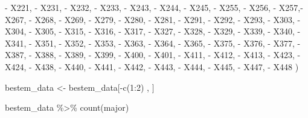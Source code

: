 \documentclass[
]{article}
\newenvironment{Shaded}{\begin{snugshade}}{\end{snugshade}}
\newcommand{\DecValTok}[1]{\textcolor[rgb]{0.00,0.00,0.81}{#1}}
\newcommand{\FunctionTok}[1]{\textcolor[rgb]{0.00,0.00,0.00}{#1}}
\newcommand{\NormalTok}[1]{#1}
\newcommand{\OtherTok}[1]{\textcolor[rgb]{0.56,0.35,0.01}{#1}}
\newcommand{\SpecialCharTok}[1]{\textcolor[rgb]{0.00,0.00,0.00}{#1}}
\begin{document}
\begin{Shaded}
\begin{Highlighting}[]
         \SpecialCharTok{{-}}\NormalTok{ X221, }\SpecialCharTok{{-}}\NormalTok{ X231, }\SpecialCharTok{{-}}\NormalTok{ X232, }\SpecialCharTok{{-}}\NormalTok{ X233, }\SpecialCharTok{{-}}\NormalTok{ X243, }\SpecialCharTok{{-}}\NormalTok{ X244, }\SpecialCharTok{{-}}\NormalTok{ X245, }\SpecialCharTok{{-}}\NormalTok{ X255, }\SpecialCharTok{{-}}\NormalTok{ X256, }\SpecialCharTok{{-}}\NormalTok{ X257,}\SpecialCharTok{{-}}\NormalTok{ X267,}
         \SpecialCharTok{{-}}\NormalTok{ X268, }\SpecialCharTok{{-}}\NormalTok{ X269, }\SpecialCharTok{{-}}\NormalTok{ X279, }\SpecialCharTok{{-}}\NormalTok{ X280, }\SpecialCharTok{{-}}\NormalTok{ X281, }\SpecialCharTok{{-}}\NormalTok{ X291, }\SpecialCharTok{{-}}\NormalTok{ X292, }\SpecialCharTok{{-}}\NormalTok{ X293, }\SpecialCharTok{{-}}\NormalTok{ X303, }\SpecialCharTok{{-}}\NormalTok{X304, }\SpecialCharTok{{-}}\NormalTok{ X305,}
         \SpecialCharTok{{-}}\NormalTok{ X315, }\SpecialCharTok{{-}}\NormalTok{ X316, }\SpecialCharTok{{-}}\NormalTok{ X317, }\SpecialCharTok{{-}}\NormalTok{ X327, }\SpecialCharTok{{-}}\NormalTok{ X328, }\SpecialCharTok{{-}}\NormalTok{ X329, }\SpecialCharTok{{-}}\NormalTok{ X339, }\SpecialCharTok{{-}}\NormalTok{ X340, }\SpecialCharTok{{-}}\NormalTok{ X341, }\SpecialCharTok{{-}}\NormalTok{ X351, }\SpecialCharTok{{-}}\NormalTok{ X352,}
         \SpecialCharTok{{-}}\NormalTok{ X353, }\SpecialCharTok{{-}}\NormalTok{ X363, }\SpecialCharTok{{-}}\NormalTok{ X364, }\SpecialCharTok{{-}}\NormalTok{ X365, }\SpecialCharTok{{-}}\NormalTok{ X375, }\SpecialCharTok{{-}}\NormalTok{ X376, }\SpecialCharTok{{-}}\NormalTok{ X377, }\SpecialCharTok{{-}}\NormalTok{ X387, }\SpecialCharTok{{-}}\NormalTok{ X388, }\SpecialCharTok{{-}}\NormalTok{ X389, }\SpecialCharTok{{-}}\NormalTok{ X399,}
         \SpecialCharTok{{-}}\NormalTok{ X400, }\SpecialCharTok{{-}}\NormalTok{ X401, }\SpecialCharTok{{-}}\NormalTok{ X411, }\SpecialCharTok{{-}}\NormalTok{ X412, }\SpecialCharTok{{-}}\NormalTok{ X413, }\SpecialCharTok{{-}}\NormalTok{ X423, }\SpecialCharTok{{-}}\NormalTok{ X424, }\SpecialCharTok{{-}}\NormalTok{ X438, }\SpecialCharTok{{-}}\NormalTok{ X440, }\SpecialCharTok{{-}}\NormalTok{ X441, }\SpecialCharTok{{-}}\NormalTok{ X442, }\SpecialCharTok{{-}}\NormalTok{ X443, }
         \SpecialCharTok{{-}}\NormalTok{ X444, }\SpecialCharTok{{-}}\NormalTok{ X445, }\SpecialCharTok{{-}}\NormalTok{ X447, }\SpecialCharTok{{-}}\NormalTok{ X448}
\NormalTok{         )}

\NormalTok{bestem\_data }\OtherTok{\textless{}{-}}\NormalTok{ bestem\_data[}\SpecialCharTok{{-}}\FunctionTok{c}\NormalTok{(}\DecValTok{1}\SpecialCharTok{:}\DecValTok{2}\NormalTok{) , ]}

\NormalTok{bestem\_data }\SpecialCharTok{\%\textgreater{}\%}
  \FunctionTok{count}\NormalTok{(major)}
\end{Highlighting}
\end{Shaded}
\end{document}
